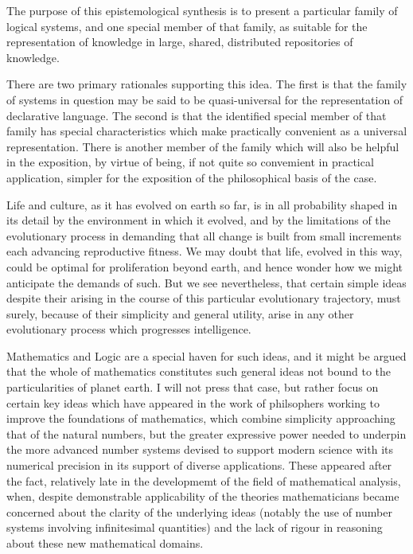 The purpose of this epistemological synthesis is to present a particular family of logical systems, and one special member of that family, as suitable for the representation of knowledge in large, shared, distributed repositories of knowledge.

There are two primary rationales supporting this idea.
The first is that the family of systems in question may be said to be quasi-universal for the representation of declarative language.
The second is that the identified special member of that family has special characteristics which make practically convenient as a universal representation.
There is another member of the family which will also be helpful in the exposition, by virtue of being, if not quite so convemient in practical application, simpler for the exposition of the philosophical basis of the case.

Life and culture, as it has evolved on earth so far, is in all probability shaped in its detail by the environment in which it evolved, and by the limitations of the evolutionary process in demanding that all change is built from small increments each advancing reproductive fitness.
We may doubt that life, evolved in this way, could be optimal for proliferation beyond earth, and hence wonder how we might anticipate the demands of such.
But we see nevertheless, that certain simple ideas despite their arising in the course of this particular evolutionary trajectory, must surely, because of their simplicity and general utility, arise in any other evolutionary process which progresses intelligence.

Mathematics and Logic are a special haven for such ideas, and it might be argued that the whole of mathematics constitutes such general ideas not bound to the particularities of planet earth.
I will not press that case, but rather focus on certain key ideas which have appeared in the work of philsophers working to improve the foundations of mathematics, which combine simplicity approaching that of the natural numbers, but the greater expressive power needed to underpin the more advanced number systems devised to support modern science with its numerical precision in its support of diverse applications.
These appeared after the fact, relatively late in the developmemt of the field of mathematical analysis, when, despite demonstrable applicability of the theories mathematicians became concerned about the clarity of the underlying ideas (notably the use of number systems involving infinitesimal quantities) and the lack of rigour in reasoning about these new mathematical domains.

